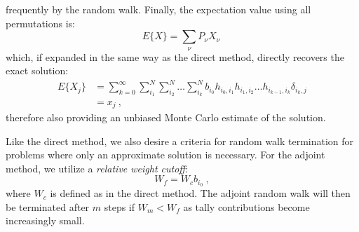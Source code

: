 frequently by the random walk. Finally, the expectation value using
all permutations is:
\begin{equation}
  E\{X\} = \sum_{\nu} P_{\nu} X_{\nu}\:
  \label{eq:adjoint_expectation_value}
\end{equation}
which, if expanded in the same way as the direct method, directly
recovers the exact solution:
\begin{equation}
  \begin{split}
    E\{X_j\} &=\sum_{k=0}^{\infty}\sum_{i_1}^{N}\sum_{i_2}^{N}\ldots
    \sum_{i_k}^{N} b_{i_0} h_{i_0,i_1}h_{i_1,i_2}\ldots h_{i_{k-1},i_k}
    \delta_{i_k,j} \\ &= x_{j}\:,
  \end{split}
  \label{eq:adjoint_expectation_expansion}
\end{equation}
therefore also providing an unbiased Monte Carlo estimate of the
solution.

Like the direct method, we also desire a criteria for random walk
termination for problems where only an approximate solution is
necessary. For the adjoint method, we utilize a \textit{relative
  weight cutoff}:
\begin{equation}
  W_f = W_c b_{i_0}\:,
  \label{eq:relative_weight_cutoff}
\end{equation}
where $W_c$ is defined as in the direct method. The adjoint random
walk will then be terminated after $m$ steps if $W_m < W_f$ as tally
contributions become increasingly small.

